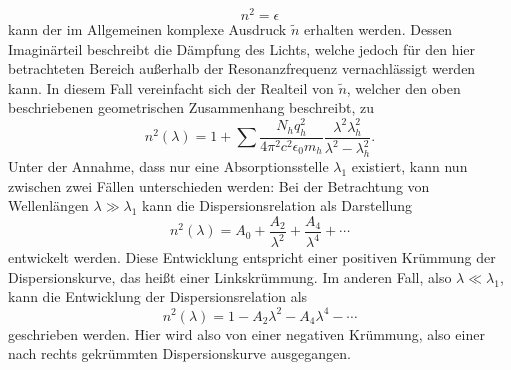 \begin{equation}
  n^2 = \epsilon
\end{equation}
kann der im Allgemeinen komplexe Ausdruck $\tilde{n}$ erhalten werden.
Dessen Imaginärteil beschreibt die Dämpfung des Lichts, welche jedoch für den hier betrachteten Bereich außerhalb der Resonanzfrequenz vernachlässigt werden kann.
In diesem Fall vereinfacht sich der Realteil von $\tilde{n}$, welcher den oben beschriebenen geometrischen Zusammenhang beschreibt, zu
\begin{equation}
  n^2(\lambda) = 1 + \sum \frac{N_h q_h^2}{4 \pi^2 c^2 \epsilon_0 m_h} \frac{\lambda^2 \lambda_h^2}{\lambda^2 - \lambda_h^2}. \label{kakapipi_ja_das_habe_ich_wirklich_geschrieben}
\end{equation}
Unter der Annahme, dass nur eine Absorptionsstelle $\lambda_1$ existiert, kann nun zwischen zwei Fällen unterschieden werden:
Bei der Betrachtung von Wellenlängen $\lambda \gg \lambda_1$ kann die Dispersionsrelation als Darstellung
\begin{equation}
  n^2(\lambda) = A_0 + \frac{A_2}{\lambda^2} + \frac{A_4}{\lambda^4} + \dotsb
  \label{eqn:d1}
\end{equation}
entwickelt werden.
Diese Entwicklung entspricht einer positiven Krümmung der Dispersionskurve, das heißt einer Linkskrümmung.
Im anderen Fall, also $\lambda \ll \lambda_1$, kann die Entwicklung der Dispersionsrelation als
\begin{equation}
  n^2(\lambda) =  1 - A_2 \lambda^2 - A_4 \lambda^4 - \dotsb
  \label{eqn:d2}
\end{equation}
geschrieben werden.
Hier wird also von einer negativen Krümmung, also einer nach rechts gekrümmten Dispersionskurve ausgegangen.
